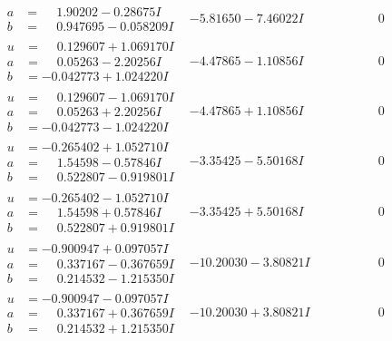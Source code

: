 \documentclass[1p]{elsarticle_modified}
\theoremstyle{definition}
\begin{document}
$$\begin{array}{c|c|c}
\begin{aligned}
a &= \phantom{-}1.90202 - 0.28675 I \\
b &= \phantom{-}0.947695 - 0.058209 I\end{aligned}
 & -5.81650 - 7.46022 I & \phantom{-0.000000 } 0 \\ \hline\begin{aligned}
u &= \phantom{-}0.129607 + 1.069170 I \\
a &= \phantom{-}0.05263 - 2.20256 I \\
b &= -0.042773 + 1.024220 I\end{aligned}
 & -4.47865 - 1.10856 I & \phantom{-0.000000 } 0 \\ \hline\begin{aligned}
u &= \phantom{-}0.129607 - 1.069170 I \\
a &= \phantom{-}0.05263 + 2.20256 I \\
b &= -0.042773 - 1.024220 I\end{aligned}
 & -4.47865 + 1.10856 I & \phantom{-0.000000 } 0 \\ \hline\begin{aligned}
u &= -0.265402 + 1.052710 I \\
a &= \phantom{-}1.54598 - 0.57846 I \\
b &= \phantom{-}0.522807 - 0.919801 I\end{aligned}
 & -3.35425 - 5.50168 I & \phantom{-0.000000 } 0 \\ \hline\begin{aligned}
u &= -0.265402 - 1.052710 I \\
a &= \phantom{-}1.54598 + 0.57846 I \\
b &= \phantom{-}0.522807 + 0.919801 I\end{aligned}
 & -3.35425 + 5.50168 I & \phantom{-0.000000 } 0 \\ \hline\begin{aligned}
u &= -0.900947 + 0.097057 I \\
a &= \phantom{-}0.337167 - 0.367659 I \\
b &= \phantom{-}0.214532 - 1.215350 I\end{aligned}
 & -10.20030 - 3.80821 I & \phantom{-0.000000 } 0 \\ \hline\begin{aligned}
u &= -0.900947 - 0.097057 I \\
a &= \phantom{-}0.337167 + 0.367659 I \\
b &= \phantom{-}0.214532 + 1.215350 I\end{aligned}
 & -10.20030 + 3.80821 I & \phantom{-0.000000 } 0 \\ \hline\begin{aligned}

\end{aligned}
\end{array}$$
\end{document}
